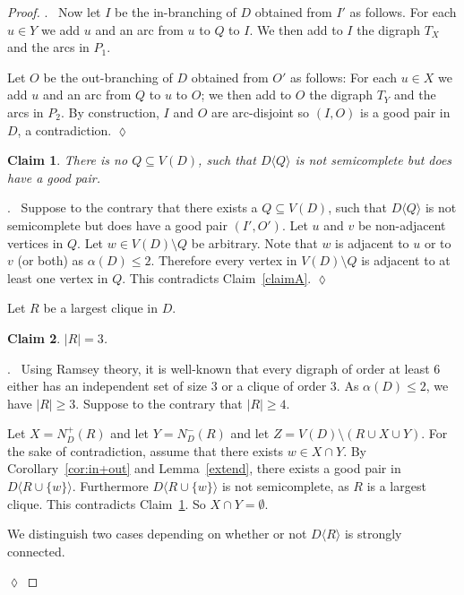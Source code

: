 \documentclass{article}
\newtheorem{claim}{Claim}[theorem]
\theoremstyle{definition}
\newcommand{\induce}[2]{#1\langle #2 \rangle}
\newcommand{\2}{\vspace{0.2cm}}
\newenvironment{subproof}{\par\noindent {\it Proof}.\ }{\hfill$\lozenge$\par\vspace{11pt}}
\begin{document}
\begin{proof}
\begin{subproof}
Now let $I$ be the in-branching of $D$ obtained from $I'$ as
follows. For each $u \in Y$ we add $u$ and an arc from $u$ to $Q$ to
$I$. We then add to $I$ the digraph $T_X$ and the arcs in $P_1$.

Let $O$ be the out-branching of $D$ obtained from $O'$ as follows: For
each $u \in X$ we add $u$ and an arc from $Q$ to $u$ to $O$; we then
add to $O$ the digraph $T_Y$ and the arcs in $P_2$.  By construction,
$I$ and $O$ are arc-disjoint so $(I,O)$ is a good pair in $D$, a
contradiction.
\end{subproof}

\begin{claim}\label{claimB}
There is no $Q \subseteq V(D)$, such that $\induce{D}{Q}$ is not
semicomplete but does have a good pair.
\end{claim}
\begin{subproof}
 Suppose to the contrary that there exists a $Q \subseteq V(D)$, such
 that $\induce{D}{Q}$ is not semicomplete but does have a good pair
 $(I',O')$.  Let $u$ and $v$ be non-adjacent vertices in $Q$. Let $w
 \in V(D) \setminus Q$ be arbitrary.  Note that $w$ is adjacent to $u$
 or to $v$ (or both) as $\alpha(D) \leq 2$. Therefore every vertex in
 $V(D) \setminus Q$ is adjacent to at least one vertex in $Q$. This
 contradicts Claim~\ref{claimA}.
\end{subproof}



Let $R$ be a largest clique in $D$. 

\begin{claim}\label{claim1}
$|R| = 3$.
\end{claim}
\begin{subproof}
Using Ramsey theory, it is well-known that every digraph of order at
least 6 either has an independent set of size 3 or a clique of order
3.  As $\alpha(D) \leq 2$, we have $|R| \geq 3$.  Suppose to the
contrary that $|R| \geq 4$.

Let $X = N_D^+(R)$ and let $Y=N_D^-(R)$ and let $Z=V(D) \setminus (R
\cup X \cup Y)$.  For the sake of contradiction, assume that there
exists $w \in X \cap Y$.  By Corollary~\ref{cor:in+out} and
Lemma~\ref{extend}, there exists a good pair in $\induce{D}{R \cup
  \{w\}}$. Furthermore $\induce{D}{R \cup \{w\}}$ is not semicomplete,
as $R$ is a largest clique. This contradicts Claim~\ref{claimB}. So $X
\cap Y = \emptyset$.

We distinguish two cases depending on whether or not $\induce{D}{R}$
is strongly connected.


\end{subproof}
\end{proof}
\end{document}
